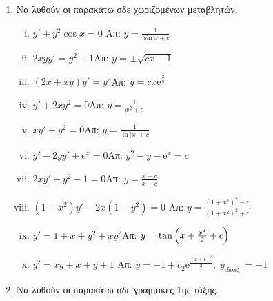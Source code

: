 



\pagestyle{askhseis}





\begin{center}
  \minibox{\large \bfseries \textcolor{Col1}{Συνήθεις Διαφορικές Εξισώσεις - 1ης τάξης}}
\end{center}

\vspace{\baselineskip}

\begin{enumerate}

  \item Να λυθούν οι παρακάτω σδε χωριζομένων μεταβλητών.

    \begin{enumerate}[i)]
      \item $ y'+y^{2} \cos{x} = 0 $ \hfill Απ: $ y = \frac{1}{\sin{x} + c} $  %
      \item $2xyy'=y^2+1$\hfill Απ: $y= \pm \sqrt{cx-1}$  %
      \item $(2x+xy)y'=y^2$\hfill Απ: $y=cx \mathrm{e}^{\frac{2}{y}}$
      \item $y'+2xy^2=0$\hfill Απ: $y=\frac{1}{x^2+c}$ %
      \item $xy'+y^2=0$\hfill Απ: $y=\frac{1}{\ln|x|+c}$ %
      \item $y'-2yy'+ \mathrm{e}^x=0$\hfill Απ: $y^2-y- \mathrm{e}^x=c$ %
      \item $2xy'+y^2-1=0$\hfill Απ: $y=\frac{x-c}{x+c}$ %
      \item $(1+x^2)y'-2x(1-y^2)=0$ %
        \hfill Απ: $y= \frac{(1+x^{2})^{2}-c}{(1+x^{2})^{2}+c}$
      \item $y'=1+x+y^2+xy^2$\hfill Απ: $y=\tan{\Bigl(x+\frac{x^2}{2}+c\Bigr)}$ %
      \item $y'=xy+x+y+1$
        \hfill Απ: $y=-1+c_2 \mathrm{e}^{\frac{(x+1)^2}{2}}, \; y_{\text{ιδιαζ.}}=-1$
    \end{enumerate}

  \item Να λυθούν οι παρακάτω σδε γραμμικές 1ης τάξης.


\end{enumerate}
